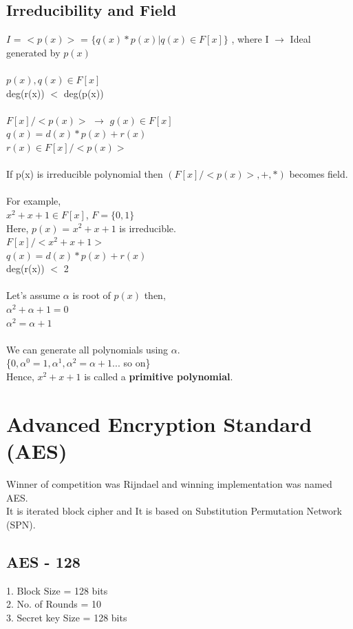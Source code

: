 \documentclass[11pt]{article}
\begin{document}
\subsection*{Irreducibility and Field}
$I$ = $<p(x)>$ = $\{q(x)*p(x) | q(x) \in F[x]\}$ , where I $\rightarrow$ Ideal generated by $p(x)$ \\ \\
$p(x), q(x) \in F[x]$ \\
deg(r(x)) $<$ deg(p(x)) \\ \\
$F[x] / <p(x)>$ $\rightarrow$ $g(x) \in F[x]$ \\
$q(x) = d(x)*p(x) + r(x)$ \\
$r(x) \in F[x] / <p(x)>$ \\ \\
If p(x) is irreducible polynomial then $(F[x] / <p(x)>,+,*)$ becomes field. \\
\\
For example, \\
$x^{2}+x+1 \in F[x]$, $F=\{0,1\}$ \\
Here, $p(x)$ = $x^{2}+x+1$ is irreducible. \\
$ F[x] / <x^{2}+x+1>$ \\
$q(x) = d(x)*p(x) + r(x)$ \\
deg(r(x)) $<$ 2 \\ \\
Let's assume $\alpha$ is root of $p(x)$ then, \\
$\alpha^{2}+\alpha+1 = 0$ \\
$\alpha^{2} = \alpha+1$ \\ \\
We can generate all polynomials using $\alpha$. \\
\{$ 0, \alpha^{0}=1, \alpha^{1}, \alpha^{2} = \alpha + 1 ...$ so on\} \\
Hence, $x^{2}+x+1$ is called a \textbf{primitive polynomial}.\\

\section*{Advanced Encryption Standard (AES)}
Winner of competition was Rijndael and winning implementation was named AES. \\
It is iterated block cipher and It is based on Substitution Permutation Network (SPN). \\

\subsection*{AES - 128}
1. Block Size = 128 bits \\
2. No. of Rounds = 10 \\
3. Secret key Size = 128 bits
\end{document}
